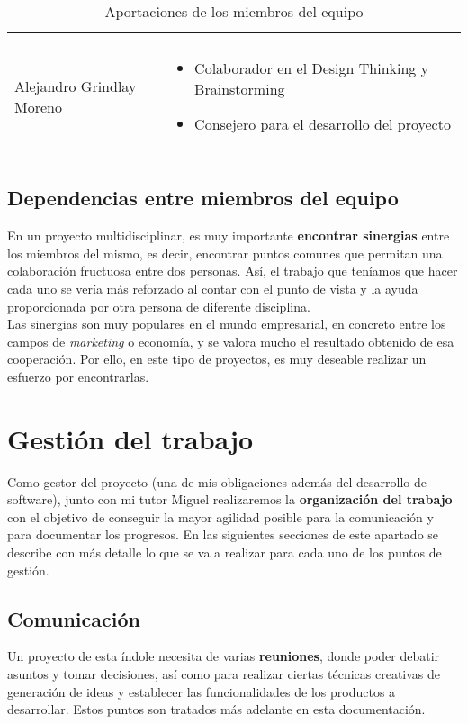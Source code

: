 \begin{longtable}{|m{4.5cm}|m{6.5cm}|}
\begin{itemize}
        \end{itemize} \\
    \hline
        Alejandro Grindlay Moreno & \begin{itemize}
            \item Colaborador en el Design Thinking y Brainstorming
            \item Consejero para el desarrollo del proyecto
        \end{itemize} \\
    \hline
    \caption{Aportaciones de los miembros del equipo}
    \label{tareassmartu}
\end{longtable}

\subsection{Dependencias entre miembros del equipo}
En un proyecto multidisciplinar, es muy importante \textbf{encontrar sinergias} entre los miembros del mismo, es decir, encontrar puntos comunes que permitan una colaboración fructuosa entre dos personas. Así, el trabajo que teníamos que hacer cada uno se vería más reforzado al contar con el punto de vista y la ayuda proporcionada por otra persona de diferente disciplina.\\

Las sinergias son muy populares en el mundo empresarial, en concreto entre los campos de \textit{marketing} o economía, y se valora mucho el resultado obtenido de esa cooperación. Por ello, en este tipo de proyectos, es muy deseable realizar un esfuerzo por encontrarlas.

\section{Gestión del trabajo}
Como gestor del proyecto (una de mis obligaciones además del desarrollo de software), junto con mi tutor Miguel realizaremos la \textbf{organización del trabajo} con el objetivo de conseguir la mayor agilidad posible para la comunicación y para documentar los progresos. En las siguientes secciones de este apartado se describe con más detalle lo que se va a realizar para cada uno de los puntos de gestión.

\subsection{Comunicación}
Un proyecto de esta índole necesita de varias \textbf{reuniones}, donde poder debatir asuntos y tomar decisiones, así como para realizar ciertas técnicas creativas de generación de ideas y establecer las funcionalidades de los productos a desarrollar. Estos puntos son tratados más adelante en esta documentación.\\

